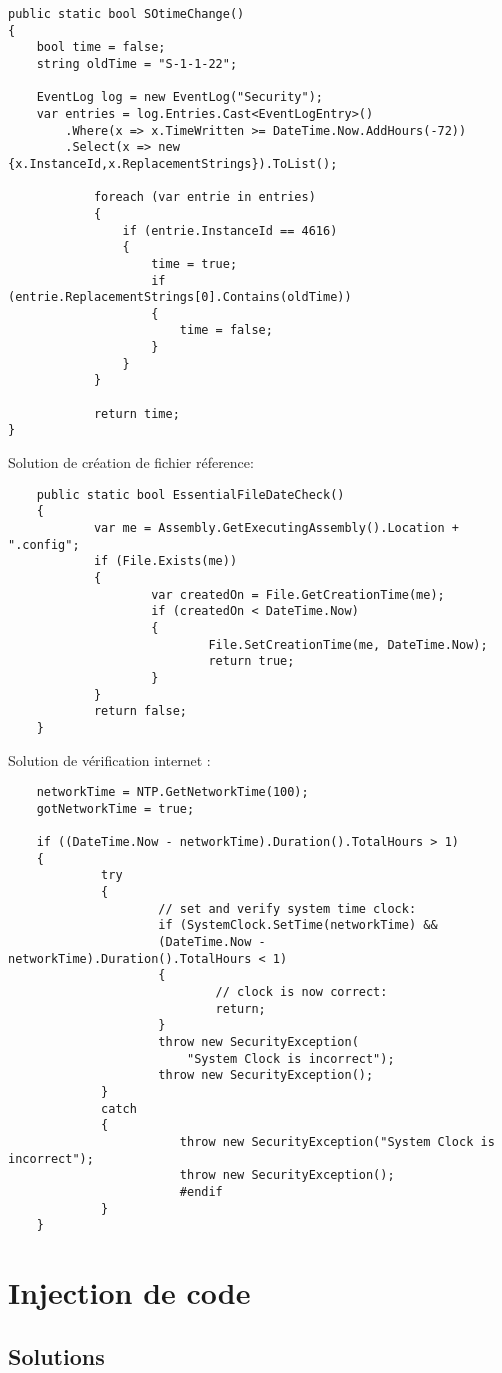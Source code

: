 \begin{adjustbox}{max width=\textwidth}
\begin{lstlisting}
public static bool SOtimeChange()
{
	bool time = false;
	string oldTime = "S-1-1-22";	

	EventLog log = new EventLog("Security");
	var entries = log.Entries.Cast<EventLogEntry>()
		.Where(x => x.TimeWritten >= DateTime.Now.AddHours(-72))
		.Select(x => new {x.InstanceId,x.ReplacementStrings}).ToList();

			foreach (var entrie in entries)
			{
				if (entrie.InstanceId == 4616)
				{
					time = true;
					if (entrie.ReplacementStrings[0].Contains(oldTime))
					{
						time = false;
					}
				}
			}

			return time;
}
\end{lstlisting}\newline
\end{adjustbox}\newline
\newline
\newline
Solution de création de fichier réference:\newline

\begin{adjustbox}{max width=\textwidth}
\begin{lstlisting}
	public static bool EssentialFileDateCheck()
	{
			var me = Assembly.GetExecutingAssembly().Location + ".config";
			if (File.Exists(me))
			{
					var createdOn = File.GetCreationTime(me);
					if (createdOn < DateTime.Now)
					{
							File.SetCreationTime(me, DateTime.Now);
							return true;
					}
			}
			return false;
	}
\end{lstlisting}\newline
\end{adjustbox}\newline
\newline
\newline
Solution de vérification internet :\newline

\begin{adjustbox}{max width=\textwidth}
\begin{lstlisting}
	networkTime = NTP.GetNetworkTime(100);
	gotNetworkTime = true;
	
	if ((DateTime.Now - networkTime).Duration().TotalHours > 1)
	{
			 try
			 {
					 // set and verify system time clock:
					 if (SystemClock.SetTime(networkTime) && 
					 (DateTime.Now - networkTime).Duration().TotalHours < 1)
					 {
							 // clock is now correct:
							 return;
					 }
					 throw new SecurityException(
						 "System Clock is incorrect");
					 throw new SecurityException();
			 }
			 catch
			 {
						throw new SecurityException("System Clock is incorrect");
						throw new SecurityException();
						#endif
			 }
	}
\end{lstlisting}\newline
\end{adjustbox}\newline

\chapter{Injection de code}

\section{Solutions}

\label{chapter:bilan}

